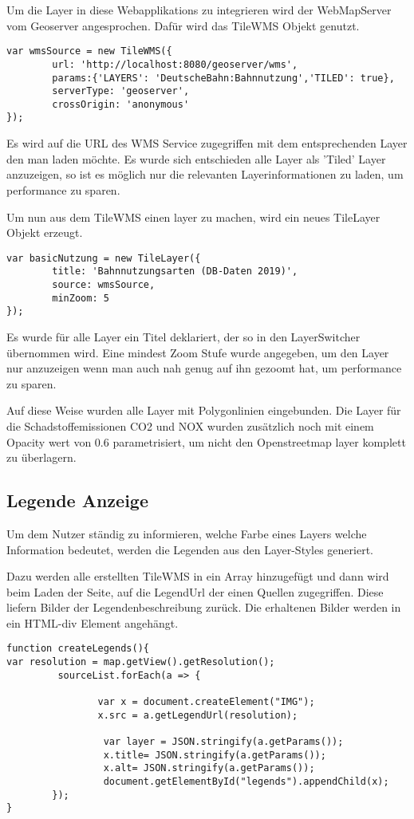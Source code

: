 Um die Layer in diese Webapplikations zu integrieren wird der WebMapServer vom Geoserver angesprochen.
Dafür wird das TileWMS Objekt genutzt.
\begin{lstlisting}[frame=single,basicstyle=\small]
var wmsSource = new TileWMS({
        url: 'http://localhost:8080/geoserver/wms',
        params:{'LAYERS': 'DeutscheBahn:Bahnnutzung','TILED': true},
        serverType: 'geoserver',
        crossOrigin: 'anonymous'
});
\end{lstlisting}
Es wird auf die URL des WMS Service zugegriffen mit dem entsprechenden Layer den man laden möchte.
Es wurde sich entschieden alle Layer als 'Tiled' Layer anzuzeigen, so ist es möglich nur die relevanten Layerinformationen zu laden, um performance zu sparen.

Um nun aus dem TileWMS einen layer zu machen, wird ein neues TileLayer Objekt erzeugt.

\begin{lstlisting}[frame=single,basicstyle=\small]
var basicNutzung = new TileLayer({
        title: 'Bahnnutzungsarten (DB-Daten 2019)',
        source: wmsSource,
        minZoom: 5
});
\end{lstlisting}

Es wurde für alle Layer ein Titel deklariert, der so in den LayerSwitcher übernommen wird. Eine mindest Zoom Stufe wurde angegeben, um den Layer nur anzuzeigen wenn man auch nah genug auf ihn gezoomt hat, um performance zu sparen.

Auf diese Weise wurden alle Layer mit Polygonlinien eingebunden.
Die Layer für die Schadstoffemissionen CO2 und NOX wurden zusätzlich noch mit einem Opacity wert von 0.6 parametrisiert, um nicht den Openstreetmap layer komplett zu überlagern. 

\subsection{Legende Anzeige}
Um dem Nutzer ständig zu informieren, welche Farbe eines Layers welche Information bedeutet, werden die Legenden aus den Layer-Styles generiert.

Dazu werden alle erstellten TileWMS in ein Array hinzugefügt und dann wird beim Laden der Seite, auf die LegendUrl der einen Quellen zugegriffen. Diese liefern Bilder der Legendenbeschreibung zurück. Die erhaltenen Bilder werden in ein HTML-div Element angehängt.


\begin{lstlisting}[frame=single,basicstyle=\small]
function createLegends(){
var resolution = map.getView().getResolution();
         sourceList.forEach(a => {
                
                var x = document.createElement("IMG");
                x.src = a.getLegendUrl(resolution);
                
                 var layer = JSON.stringify(a.getParams());
                 x.title= JSON.stringify(a.getParams());
                 x.alt= JSON.stringify(a.getParams());
                 document.getElementById("legends").appendChild(x);
        });
}
\end{lstlisting}

